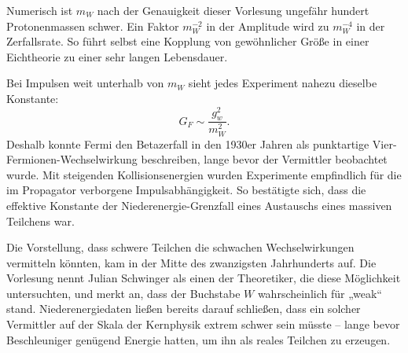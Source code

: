 Numerisch ist \(m_W\) nach der Genauigkeit dieser Vorlesung ungefähr hundert Protonenmassen schwer. Ein Faktor \(m_W^{-2}\) in der Amplitude wird zu \(m_W^{-4}\) in der Zerfallsrate. So führt selbst eine Kopplung von gewöhnlicher Größe in einer Eichtheorie zu einer sehr langen Lebensdauer.

\begin{classroomqa}\end{classroomqa}

Bei Impulsen weit unterhalb von \(m_W\) sieht jedes Experiment nahezu dieselbe Konstante:
\begin{equation}
  G_F\sim\frac{g_w^2}{m_W^2}.
\end{equation}
Deshalb konnte Fermi den Betazerfall in den 1930er Jahren als punktartige Vier-Fermionen-Wechselwirkung beschreiben, lange bevor der Vermittler beobachtet wurde. Mit steigenden Kollisionsenergien wurden Experimente empfindlich für die im Propagator verborgene Impulsabhängigkeit. So bestätigte sich, dass die effektive Konstante der Niederenergie-Grenzfall eines Austauschs eines massiven Teilchens war.

Die Vorstellung, dass schwere Teilchen die schwachen Wechselwirkungen vermitteln könnten, kam in der Mitte des zwanzigsten Jahrhunderts auf. Die Vorlesung nennt Julian Schwinger als einen der Theoretiker, die diese Möglichkeit untersuchten, und merkt an, dass der Buchstabe \(W\) wahrscheinlich für „weak“ stand. Niederenergiedaten ließen bereits darauf schließen, dass ein solcher Vermittler auf der Skala der Kernphysik extrem schwer sein müsste – lange bevor Beschleuniger genügend Energie hatten, um ihn als reales Teilchen zu erzeugen.

